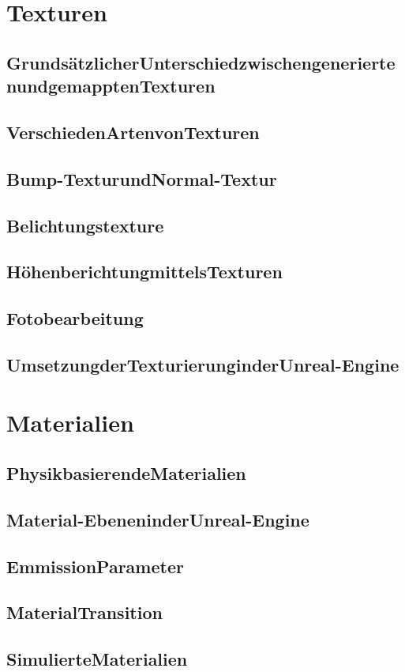 \section{Texturen}
\subsection{GrundsätzlicherUnterschiedzwischengeneriertenundgemapptenTexturen}
\subsection{VerschiedenArtenvonTexturen}

\subsection{Bump-TexturundNormal-Textur}
\label{sec:tex_normal}

\subsection{Belichtungstexture}
\subsection{HöhenberichtungmittelsTexturen}
\subsection{Fotobearbeitung}
\subsection{UmsetzungderTexturierunginderUnreal-Engine}

\section{Materialien}
\subsection{PhysikbasierendeMaterialien}
\subsection{Material-EbeneninderUnreal-Engine}
\subsection{EmmissionParameter}
\subsection{MaterialTransition}
\subsection{SimulierteMaterialien}
